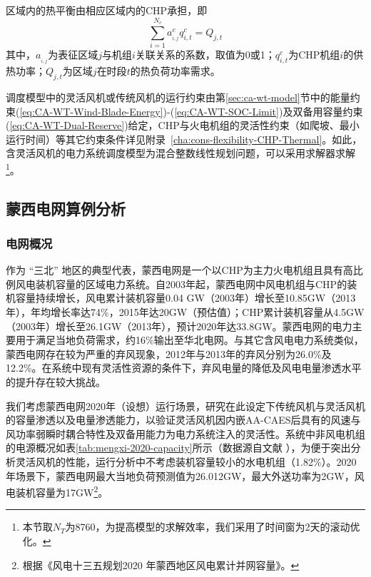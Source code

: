 
区域内的热平衡由相应区域内的CHP承担，即
\begin{equation}
\sum\limits_{i = 1}^{{N_c}} {a_{_{i,j}}^cq_{i,t}^c}  = {Q_{j,t}}
\end{equation}
其中，$a_{_{i,j}}$为表征区域$j$与机组$i$关联关系的系数，取值为0或1；$q_{i,t}^c$为CHP机组$i$的供热功率；$Q_{j,t}$为区域$j$在时段$t$的热负荷功率需求。

调度模型中的灵活风机或传统风机的运行约束由第\ref{sec:ca-wt-model}节中的能量约束(\ref{eq:CA-WT-Wind-Blade-Energy})-(\ref{eq:CA-WT-SOC-Limit})及双备用容量约束(\ref{eq:CA-WT-Dual-Reserve})给定，CHP与火电机组的灵活性约束（如爬坡、最小运行时间）等其它约束条件详见附录~\ref{cha:cons-flexibility-CHP-Thermal}。如此，含灵活风机的电力系统调度模型为混合整数线性规划问题，可以采用求解器求解\footnote{本节取$N_T$为8760，为提高模型的求解效率，我们采用了时间窗为2天的滚动优化。}。

\subsection{蒙西电网算例分析}

\subsubsection{电网概况}
作为 “三北” 地区的典型代表，蒙西电网是一个以CHP为主力火电机组且具有高比例风电装机容量的区域电力系统。自2003年起，蒙西电网中风电机组与CHP的装机容量持续增长，风电累计装机容量0.04 GW（2003年）增长至10.85GW（2013年），年均增长率达74\%，2015年达20GW（预估值）\cite{Jinlin-Curtail-16}；CHP累计装机容量从4.5GW（2003年）增长至26.1GW（2013年），预计2020年达33.8GW\cite{Jinlin-Curtail-16}。蒙西电网的电力主要用于满足当地负荷需求，约16\%输出至华北电网。与其它含风电电力系统类似，蒙西电网存在较为严重的弃风现象，2012年与2013年的弃风分别为26.0\%及12.2\%。在系统中现有灵活性资源的条件下，弃风电量的降低及风电电量渗透水平的提升存在较大挑战。

我们考虑蒙西电网2020年（设想）运行场景，研究在此设定下传统风机与灵活风机的容量渗透以及电量渗透能力，以验证灵活风机因内嵌AA-CAES后具有的风速与风功率弱瞬时耦合特性及双备用能力为电力系统注入的灵活性。系统中非风电机组的电源概况如表\ref{tab:mengxi-2020-capacity}所示（数据源自文献
），为便于突出分析灵活风机的性能，运行分析中不考虑装机容量较小的水电机组（1.82\%）。2020 年场景下，蒙西电网最大当地负荷预测值为26.012GW，最大外送功率为2GW，风电装机容量为17GW\footnote{根据《风电十三五规划2020 年蒙西地区风电累计并网容量》。}。

